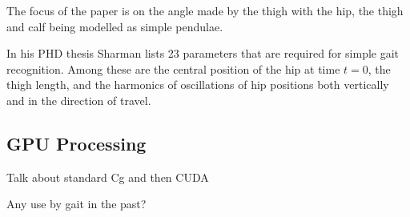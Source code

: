 The focus of the paper is on the angle made by the thigh with the hip, the thigh and calf being modelled as simple pendulae.

In his PHD thesis \cite{KarlSharman} Sharman lists 23 parameters that are required for simple gait recognition.
Among these are the central position of the hip at time $t = 0$, the thigh length, and the harmonics of oscillations of hip positions both vertically and in the direction of travel.


\subsection{GPU Processing}

Talk about standard Cg and then CUDA \cite{CgToolkit} \cite{CudaToolkit}

Any use by gait in the past?
